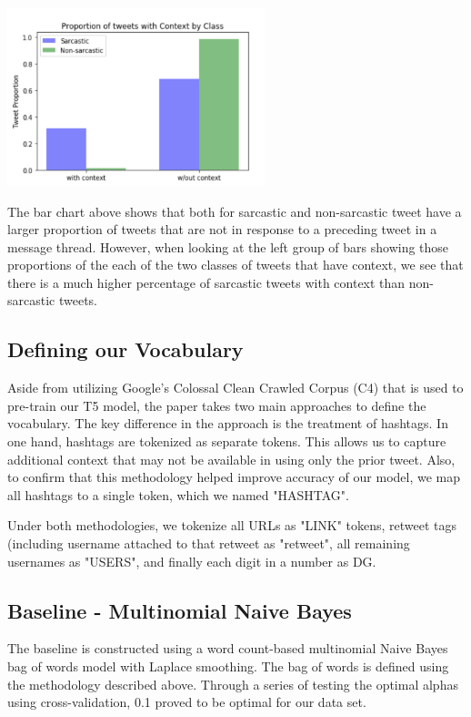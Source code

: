 \documentclass[11pt,a4paper]{article}
\begin{document}
\includegraphics[width=75mm,scale=0.5]{context_proportion.png}

The bar chart above shows that both for sarcastic and non-sarcastic tweet have a larger proportion of tweets that are not in response to a preceding tweet in a message thread.  However, when looking at the left group of bars showing those proportions of the each of the two classes of tweets that have context, we see that there is a much higher percentage of sarcastic tweets with context than non-sarcastic tweets.

\subsection{Defining our Vocabulary}

Aside from utilizing Google's Colossal Clean Crawled Corpus (C4) that is used to pre-train our T5 model, the paper takes two main approaches to define the vocabulary. The key difference in the approach is the treatment of hashtags. In one hand, hashtags are tokenized as separate tokens. This allows us to capture additional context that may not be available in using only the prior tweet. Also, to confirm that this methodology helped improve accuracy of our model, we map all hashtags to a single token, which we named "HASHTAG". 

Under both methodologies, we tokenize all URLs as "LINK" tokens, retweet tags (including username attached to that retweet as "retweet", all remaining usernames as "USERS", and finally each digit in a number as DG. 

\subsection{Baseline - Multinomial Naive Bayes}
The baseline is constructed using a word count-based multinomial Naive Bayes bag of words model with Laplace smoothing. The bag of words is defined using the methodology described above. 
Through a series of testing the optimal alphas using cross-validation, 0.1 proved to be optimal for our data set.
\end{document}
